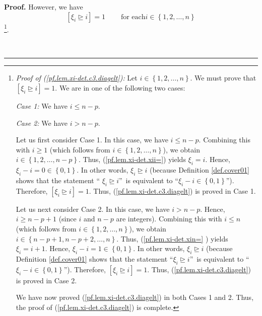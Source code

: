\documentclass[numbers=enddot,12pt,final,onecolumn,notitlepage,english]{scrartcl}%
\theoremstyle{definition}
\newenvironment{proof}[1][Proof]{\noindent\textbf{#1.} }{\ \rule{0.5em}{0.5em}}
\newenvironment{verlong}{}{}
\begin{document}
\begin{proof}
\begin{verlong}
However, we have
\begin{equation}
\left[  \xi_{i}\trianglerighteq i\right]  =1\ \ \ \ \ \ \ \ \ \ \text{for each
}i\in\left\{  1,2,\ldots,n\right\}  \label{pf.lem.xi-det.c3.diagelt}%
\end{equation}
\footnote{\textit{Proof of (\ref{pf.lem.xi-det.c3.diagelt}):} Let
$i\in\left\{  1,2,\ldots,n\right\}  $. We must prove that $\left[  \xi
_{i}\trianglerighteq i\right]  =1$. We are in one of the following two cases:
\par
\textit{Case 1:} We have $i\leq n-p$.
\par
\textit{Case 2:} We have $i>n-p$.
\par
Let us first consider Case 1. In this case, we have $i\leq n-p$. Combining
this with $i\geq1$ (which follows from $i\in\left\{  1,2,\ldots,n\right\}  $),
we obtain $i\in\left\{  1,2,\ldots,n-p\right\}  $. Thus,
(\ref{pf.lem.xi-det.xii=}) yields $\xi_{i}=i$. Hence, $\xi_{i}-i=0\in\left\{
0,1\right\}  $. In other words, $\xi_{i}\trianglerighteq i$ (because
Definition \ref{def.cover01} shows that the statement \textquotedblleft%
$\xi_{i}\trianglerighteq i$\textquotedblright\ is equivalent to
\textquotedblleft$\xi_{i}-i\in\left\{  0,1\right\}  $\textquotedblright).
Therefore, $\left[  \xi_{i}\trianglerighteq i\right]  =1$. Thus,
(\ref{pf.lem.xi-det.c3.diagelt}) is proved in Case 1.
\par
Let us next consider Case 2. In this case, we have $i>n-p$. Hence, $i\geq
n-p+1$ (since $i$ and $n-p$ are integers). Combining this with $i\leq n$
(which follows from $i\in\left\{  1,2,\ldots,n\right\}  $), we obtain
$i\in\left\{  n-p+1,n-p+2,\ldots,n\right\}  $. Thus, (\ref{pf.lem.xi-det.xin=}%
) yields $\xi_{i}=i+1$. Hence, $\xi_{i}-i=1\in\left\{  0,1\right\}  $. In
other words, $\xi_{i}\trianglerighteq i$ (because Definition \ref{def.cover01}
shows that the statement \textquotedblleft$\xi_{i}\trianglerighteq
i$\textquotedblright\ is equivalent to \textquotedblleft$\xi_{i}-i\in\left\{
0,1\right\}  $\textquotedblright). Therefore, $\left[  \xi_{i}\trianglerighteq
i\right]  =1$. Thus, (\ref{pf.lem.xi-det.c3.diagelt}) is proved in Case 2.
\par
We have now proved (\ref{pf.lem.xi-det.c3.diagelt}) in both Cases 1 and 2.
Thus, the proof of (\ref{pf.lem.xi-det.c3.diagelt}) is complete.}.


\end{verlong}
\end{proof}
\end{document}
